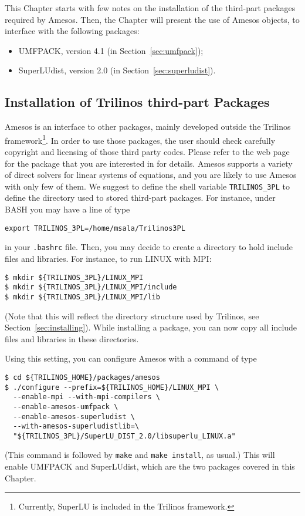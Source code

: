 This Chapter starts with few notes on the installation of the third-part
packages required by Amesos. Then, the Chapter will present the use of
Amesos objects, to interface with the following packages:
\begin{itemize}
\item UMFPACK, version 4.1 (in Section~\ref{sec:umfpack});
\item SuperLUdist, version 2.0 (in Section~\ref{sec:superludist}).
\end{itemize}


\subsection{Installation of Trilinos third-part Packages}
\label{sec:3pl}

Amesos is an interface to other packages, mainly developed outside the
Trilinos framework\footnote{Currently, SuperLU is included in the
  Trilinos framework.}. In order to use those packages, the user should
check carefully copyright and licensing of those third party codes.
Please refer to the web page for the package that you are interested in
for details. Amesos supports a variety of direct solvers for linear
systems of equations, and you are likely to use Amesos with only few of
them. We suggest to define the shell variable \verb!TRILINOS_3PL!  to
define the directory used to stored third-part packages. For instance,
under BASH you may have a line of type
\begin{verbatim}
export TRILINOS_3PL=/home/msala/Trilinos3PL
\end{verbatim}
in your \verb!.bashrc! file. Then, you may decide to create a directory
to hold include files and libraries. For instance, to run LINUX with
MPI:
\begin{verbatim}
$ mkdir ${TRILINOS_3PL}/LINUX_MPI
$ mkdir ${TRILINOS_3PL}/LINUX_MPI/include
$ mkdir ${TRILINOS_3PL}/LINUX_MPI/lib
\end{verbatim}
(Note that this will reflect the directory structure used by Trilinos,
see Section~\ref{sec:installing}). While installing a package, you can
now copy all include files and libraries in these directories.

Using this setting, you can configure Amesos with a command of type
\begin{verbatim}
$ cd ${TRILINOS_HOME}/packages/amesos
$ ./configure --prefix=${TRILINOS_HOME}/LINUX_MPI \
  --enable-mpi --with-mpi-compilers \
  --enable-amesos-umfpack \
  --enable-amesos-superludist \
  --with-amesos-superludistlib=\
  "${TRILINOS_3PL}/SuperLU_DIST_2.0/libsuperlu_LINUX.a"
\end{verbatim}
(This command is followed by \verb!make! and \verb!make install!, as
usual.)  This will enable UMFPACK and SuperLUdist, which are the two
packages covered in this Chapter.

